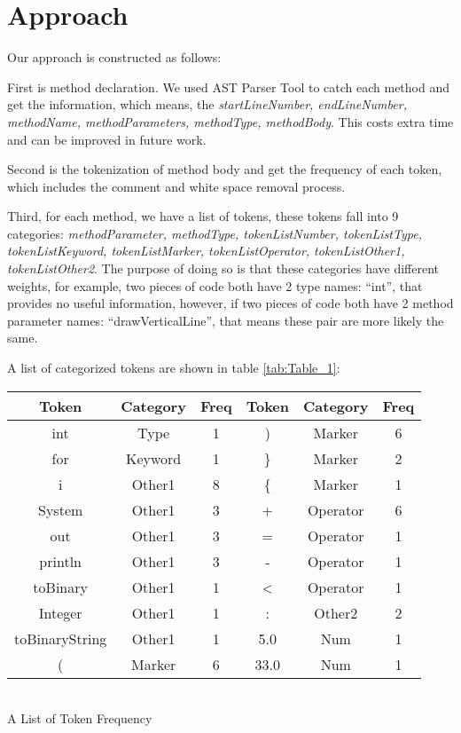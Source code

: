 \documentclass[../main.tex]{subfiles}
\begin{document}
\section{Approach}

Our approach is constructed as follows:

First is method declaration. We used AST Parser Tool to catch each method and get the information, which means, the \textit{startLineNumber, endLineNumber, methodName, methodParameters, methodType, methodBody}. This costs extra time and can be improved in future work.

Second is the tokenization of method body and get the frequency of each token, which includes the comment and white space removal process.

Third, for each method, we have a list of tokens, these tokens fall into 9 categories: \textit{methodParameter, methodType, tokenListNumber, tokenListType, tokenListKeyword, tokenListMarker, tokenListOperator, tokenListOther1, tokenListOther2}. The purpose of doing so is that these categories have different weights, for example, two pieces of code both have 2 type names: ``int'', that provides no useful information, however, if two pieces of code both have 2 method parameter names: ``drawVerticalLine'', that means these pair are more likely the same.

A list of categorized tokens are shown in table \ref{tab:Table_1}:\\

\begin{tablehere}
\footnotesize
\begin{tabular}[h]{|c|c|c||c|c|c|}
\hline
Token & Category & Freq 	& Token & Category & Freq\\
\hline
int & Type &1 		&  ) & Marker & 6\\
\hline
for & Keyword & 1 	& \} & Marker & 2\\
\hline
i & Other1 & 8		& \{ & Marker & 1\\
\hline
System & Other1 & 3	& + & Operator & 6\\
\hline
out & Other1 & 3	& = & Operator & 1\\
\hline
println & Other1 & 3	& - & Operator & 1\\
\hline
toBinary & Other1 & 1	& < & Operator & 1\\
\hline
Integer & Other1 & 1	& : & Other2 & 2\\
\hline
toBinaryString & Other1 & 1	& 5.0 & Num & 1\\
\hline
( & Marker & 6		& 33.0 & Num & 1\\
\hline
\end{tabular}\\
\caption{A List of Token Frequency}\label{tab:Table_1}
\end{tablehere}
\end{document}
